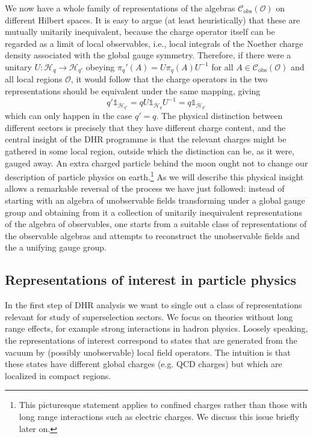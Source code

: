 \documentclass[12pt,a4paper]{article}
\newcommand{\1}{\mathds{1}}                         %
\newcommand{\Ocal}{\mathcal{O}}
\newcommand{\HH}{{\mathcal{H}}}
\newcommand{\II}{{\mathbb{1}}}
\newcommand{\Cc}{{\mathcal{C}}}
\begin{document}
We now have a whole family of representations of the algebras $\Cc_{\text{obs}}(\Ocal)$ on different Hilbert spaces. It is easy to argue (at least heuristically) that these are mutually unitarily inequivalent, because the charge operator itself can be regarded as a limit of local observables, i.e., local integrals of the Noether charge density associated with the global gauge symmetry. Therefore, if there were a unitary $U:\HH_q\to\HH_{q'}$ obeying $\pi_q'(A) = U\pi_q(A)U^{-1}$ for all $A\in\Cc_{\text{obs}}(\Ocal)$ and all local regions $\Ocal$, it would follow that
the charge operators in the two representations should be equivalent under the same mapping, giving
\[
q'\II_{\HH_{q'}} = q U\II_{\HH_{q}} U^{-1} = q \II_{\HH_{q'}}
\] 
which can only happen in the case $q'=q$. The physical distinction between different sectors is precisely that they have different charge content, and the central insight of the DHR programme is that the relevant charges might be gathered in some local region, outside which the distinction can be, as it were, gauged away.  An extra charged particle behind the moon ought not to change our description of particle physics on earth.\footnote{This picturesque statement applies to confined charges rather than those with  long range interactions such as electric charges. We discuss this issue briefly later on.} As we will describe this physical insight allows a remarkable reversal of the process we have just followed: instead of starting with an algebra of unobservable fields transforming under a global gauge group and obtaining from it a collection of unitarily inequivalent representations of the algebra of observables, one starts from a suitable class of representations of the observable algebras and attempts to reconstruct the unobservable fields and the a unifying gauge group. 

\subsection{Representations of interest in particle physics}\label{interest}
In the first step of DHR analysis we want to single out a class of representations relevant for study of superselection sectors. We focus on theories without long range effects, for example strong interactions in hadron physics. Loosely speaking, the representations of interest correspond to states that are generated from the vacuum by (possibly unobservable) local field operators. The intuition is that these states have different global charges (e.g. QCD charges) but which are localized in compact regions.
\end{document}
